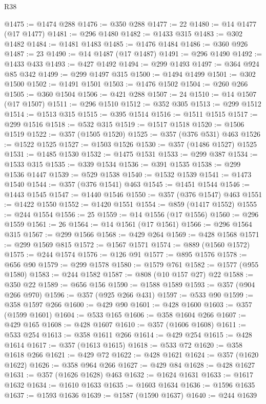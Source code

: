 \begin{lexlean}{R38}
\begin{coremodule}
@1475 := @1474 @288
@1476 := @350 @288
@1477 := 22
@1480 := @14 @1477 (@17 @1477)
@1481 := @296 @1480
@1482 := @1433 @315
@1483 := @302 @1482
@1484 := @1481 @1483
@1485 := @1476 @1484
@1486 := @360 @926
@1487 := 23
@1490 := @14 @1487 (@17 @1487)
@1491 := @296 @1490
@1492 := @1433 @433
@1493 := @427 @1492
@1494 := @299 @1493
@1497 := @364 @924 @85 @342
@1499 := @299 @1497 @315
@1500 := @1494 @1499
@1501 := @302 @1500
@1502 := @1491 @1501
@1503 := @1476 @1502
@1504 := @260 @266
@1505 := @360 @1504
@1506 := @421 @288
@1507 := 24
@1510 := @14 @1507 (@17 @1507)
@1511 := @296 @1510
@1512 := @352 @305
@1513 := @299 @1512
@1514 := @1513 @315
@1515 := @395 @1514
@1516 := @1511 @1515
@1517 := @299 @1516
@1518 := @532 @315
@1519 := @1517 @1518
@1520 := @1506 @1519
@1522 := @357 (@1505 @1520)
@1525 := @357 (@376 @531) @463
@1526 := @1522 @1525
@1527 := @1503 @1526
@1530 := @357 (@1486 @1527) @1525
@1531 := @1485 @1530
@1532 := @1475 @1531
@1533 := @299 @387
@1534 := @1533 @315
@1535 := @339 @1534
@1536 := @391 @1535
@1538 := @299 @1536 @1447
@1539 := @529 @1538
@1540 := @1532 @1539
@1541 := @1473 @1540
@1544 := @357 (@376 @1541) @463
@1545 := @1451 @1544
@1546 := @1443 @1545
@1547 := @1440 @1546
@1550 := @357 (@376 @1547) @463
@1551 := @1422 @1550
@1552 := @1420 @1551
@1554 := @859 (@1417 @1552)
@1555 := @244 @1554
@1556 := 25
@1559 := @14 @1556 (@17 @1556)
@1560 := @296 @1559
@1561 := 26
@1564 := @14 @1561 (@17 @1561)
@1566 := @296 @1564 @315
@1567 := @299 @1566
@1568 := @429 @264
@1569 := @428 @1568
@1571 := @299 @1569 @815
@1572 := @1567 @1571
@1574 := @889 (@1560 @1572)
@1575 := @244 @1574
@1576 := @126 @91
@1577 := @895 @1576
@1578 := @656 @90
@1579 := @299 @1578
@1580 := @1579 @761
@1582 := @1577 (@955 @1580)
@1583 := @244 @1582
@1587 := @808 (@10 @157 @27) @22
@1588 := @350 @22
@1589 := @656 @156
@1590 := @1588 @1589
@1593 := @357 (@904 @266 @970)
@1596 := @357 (@925 @266 @431)
@1597 := @533 @90
@1599 := @358 @1597 @266
@1600 := @429 @90
@1601 := @428 @1600
@1603 := @357 (@1599 @1601)
@1604 := @533 @165
@1606 := @358 @1604 @266
@1607 := @429 @165
@1608 := @428 @1607
@1610 := @357 (@1606 @1608)
@1611 := @533 @254
@1613 := @358 @1611 @266
@1614 := @429 @254
@1615 := @428 @1614
@1617 := @357 (@1613 @1615)
@1618 := @533 @72
@1620 := @358 @1618 @266
@1621 := @429 @72
@1622 := @428 @1621
@1624 := @357 (@1620 @1622)
@1626 := @358 @964 @266
@1627 := @429 @84
@1628 := @428 @1627
@1631 := @357 (@1626 @1628) @463
@1632 := @1624 @1631
@1633 := @1617 @1632
@1634 := @1610 @1633
@1635 := @1603 @1634
@1636 := @1596 @1635
@1637 := @1593 @1636
@1639 := @1587 (@1590 @1637)
@1640 := @244 @1639

\end{coremodule}
\end{lexlean}
